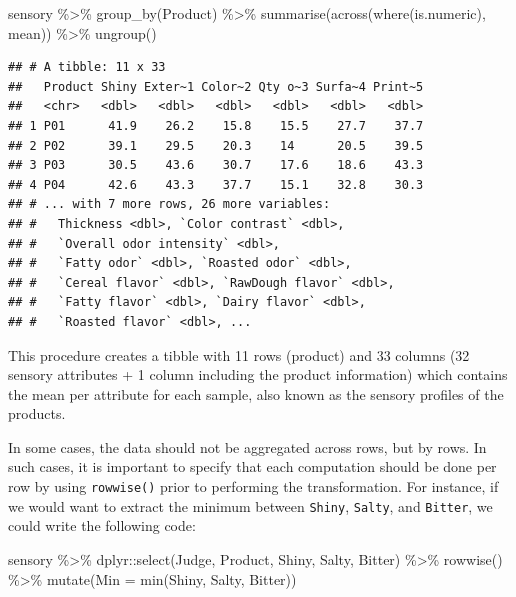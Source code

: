 \documentclass[
]{krantz}
\makeatletter
\newenvironment{Shaded}{\begin{snugshade}}{\end{snugshade}}
\newcommand{\AttributeTok}[1]{\textcolor[rgb]{0.61,0.61,0.61}{#1}}
\newcommand{\FunctionTok}[1]{\textcolor[rgb]{0,0,0}{#1}}
\newcommand{\NormalTok}[1]{#1}
\newcommand{\SpecialCharTok}[1]{\textcolor[rgb]{0,0,0}{#1}}
\renewenvironment{quote}{\begin{VF}}{\end{VF}}
\newenvironment{kframe}{%
\medskip{}
\setlength{\fboxsep}{.8em}
 \def\at@end@of@kframe{}%
 \ifinner\ifhmode%
  \def\at@end@of@kframe{\end{minipage}}%
  \begin{minipage}{\columnwidth}%
 \fi\fi%
 \def\FrameCommand##1{\hskip\@totalleftmargin \hskip-\fboxsep
 \colorbox{shadecolor}{##1}\hskip-\fboxsep
     \hskip-\linewidth \hskip-\@totalleftmargin \hskip\columnwidth}%
 \MakeFramed {\advance\hsize-\width
   \@totalleftmargin\z@ \linewidth\hsize
   \@setminipage}}%
 {\par\unskip\endMakeFramed%
 \at@end@of@kframe}
\renewenvironment{Shaded}{\begin{kframe}}{\end{kframe}}
\makeatother
\begin{document}
\begin{Shaded}
\begin{Highlighting}[]
\NormalTok{sensory }\SpecialCharTok{\%\textgreater{}\%}
  \FunctionTok{group\_by}\NormalTok{(Product) }\SpecialCharTok{\%\textgreater{}\%}
  \FunctionTok{summarise}\NormalTok{(}\FunctionTok{across}\NormalTok{(}\FunctionTok{where}\NormalTok{(is.numeric), mean)) }\SpecialCharTok{\%\textgreater{}\%}
  \FunctionTok{ungroup}\NormalTok{()}
\end{Highlighting}
\end{Shaded}

\begin{verbatim}
## # A tibble: 11 x 33
##   Product Shiny Exter~1 Color~2 Qty o~3 Surfa~4 Print~5
##   <chr>   <dbl>   <dbl>   <dbl>   <dbl>   <dbl>   <dbl>
## 1 P01      41.9    26.2    15.8    15.5    27.7    37.7
## 2 P02      39.1    29.5    20.3    14      20.5    39.5
## 3 P03      30.5    43.6    30.7    17.6    18.6    43.3
## 4 P04      42.6    43.3    37.7    15.1    32.8    30.3
## # ... with 7 more rows, 26 more variables:
## #   Thickness <dbl>, `Color contrast` <dbl>,
## #   `Overall odor intensity` <dbl>,
## #   `Fatty odor` <dbl>, `Roasted odor` <dbl>,
## #   `Cereal flavor` <dbl>, `RawDough flavor` <dbl>,
## #   `Fatty flavor` <dbl>, `Dairy flavor` <dbl>,
## #   `Roasted flavor` <dbl>, ...
\end{verbatim}

This procedure creates a tibble with 11 rows (product) and 33 columns (32 sensory attributes + 1 column including the product information) which contains the mean per attribute for each sample, also known as the sensory profiles of the products.

\begin{quote}
In some cases, the data should not be aggregated across rows, but by rows. In such cases, it is important to specify that each computation should be done per row by using \texttt{rowwise()} prior to performing the transformation. For instance, if we would want to extract the minimum between \texttt{Shiny}, \texttt{Salty}, and \texttt{Bitter}, we could write the following code:
\end{quote}

\begin{Shaded}
\begin{Highlighting}[]
\NormalTok{sensory }\SpecialCharTok{\%\textgreater{}\%}
\NormalTok{  dplyr}\SpecialCharTok{::}\FunctionTok{select}\NormalTok{(Judge, Product, Shiny, Salty, Bitter) }\SpecialCharTok{\%\textgreater{}\%}
  \FunctionTok{rowwise}\NormalTok{() }\SpecialCharTok{\%\textgreater{}\%}
  \FunctionTok{mutate}\NormalTok{(}\AttributeTok{Min =} \FunctionTok{min}\NormalTok{(Shiny, Salty, Bitter))}
\end{Highlighting}
\end{Shaded}
\end{document}
